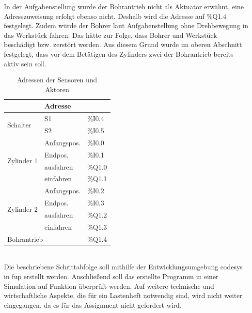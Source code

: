 In der Aufgabenstellung wurde der Bohrantrieb nicht als Aktuator erwähnt, eine Adresszuweisung erfolgt ebenso nicht. Deshalb wird die Adresse auf \%Q1.4 festgelegt. Zudem würde der Bohrer laut Aufgabenstellung ohne Drehbewegung in das Werkstück fahren. Das hätte zur Folge, dass Bohrer und Werkstück beschädigt bzw. zerstört werden. Aus diesem Grund wurde im oberen Abschnitt festgelegt, dass vor dem Betätigen des Zylinders zwei der Bohrantrieb bereits aktiv sein soll.
\begin{table}[h]
    \centering
\begin{tabular}{|p{2.5cm}|p{2.5cm}|p{1.5cm}|}
    \rowcolor{gray}
    \hline
    \multicolumn{2}{|c|}{\textbf{Benennung}} &  \textbf{Adresse}\\
    \hline
    \multirow{2}{4em}{Schalter} & S1 & \%I0.4 \\
    & S2 & \%I0.5 \\
    \hline
    \multirow{4}{5em}{Zylinder 1} & Anfangspos. & \%I0.0 \\
    & Endpos. & \%I0.1 \\
    & ausfahren & \%Q1.0 \\
    & einfahren & \%Q1.1 \\
    \hline
    \multirow{4}{5em}{Zylinder 2} & Anfangspos. & \%I0.2 \\
    & Endpos. & \%I0.3 \\
    & ausfahren & \%Q1.2 \\
    & einfahren & \%Q1.3 \\
    \hline
    \multicolumn{2}{|l|}{Bohrantrieb} & \%Q1.4 \\
    \hline
\end{tabular}
    \caption{Adressen der Sensoren und Aktoren}
    \label{tab:Adressen}
\end{table}\\
Die beschriebene Schrittabfolge soll mithilfe der Entwicklungsumgebung \ac{codesys} in \ac{fup} erstellt werden. Anschließend soll das erstellte Programm in einer Simulation auf Funktion überprüft werden.
Auf weitere technische und wirtschaftliche Aspekte, die für ein Lastenheft notwendig sind, wird nicht weiter eingegangen, da es für das Assignment nicht gefordert wird.
